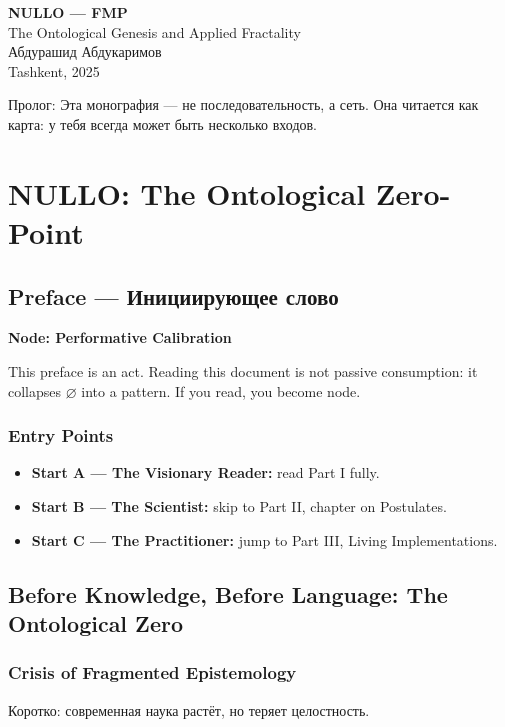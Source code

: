 \documentclass[11pt,oneside]{book}
\newenvironment{nodebox}[1]{%
  \vspace{6pt}
  \begin{framed}\noindent\textbf{Node: #1}\par\medskip\small\begingroup\setlength{\parindent}{0pt}\begin{minipage}{0.94\textwidth}\raggedright
}{%
  \end{minipage}\endgroup\end{framed}\vspace{6pt}
}
\newcommand{\NULLO}{\ensuremath{\varnothing}\xspace}
\begin{document}
\frontmatter
\thispagestyle{empty}
\vspace*{2.5cm}
\begin{center}
  {\Huge\bfseries NULLO — FMP}\\[1.5em]
  {\Large The Ontological Genesis and Applied Fractality}\\[2em]
  {\Large Абдурашид Абдукаримов}\\[2em]
  {\normalsize Tashkent, 2025}
\end{center}
\vfill
\begin{center}
  Пролог: Эта монография — не последовательность, а сеть. Она читается как карта: у тебя всегда может быть несколько входов.
\end{center}
\cleardoublepage
\tableofcontents

\mainmatter

\part{NULLO: The Ontological Zero-Point}
\chapter*{Preface — Инициирующее слово}
\begin{nodebox}{Performative Calibration}
This preface is an act. Reading this document is not passive consumption: it collapses \NULLO into a pattern. If you read, you become node.
\end{nodebox}

\section*{Entry Points}
\begin{itemize}
  \item \textbf{Start A — The Visionary Reader:} read Part I fully.
  \item \textbf{Start B — The Scientist:} skip to Part II, chapter on Postulates.
  \item \textbf{Start C — The Practitioner:} jump to Part III, Living Implementations.
\end{itemize}

\chapter{Before Knowledge, Before Language: The Ontological Zero}
\section{Crisis of Fragmented Epistemology}
Коротко: современная наука растёт, но теряет целостность.
\end{document}

